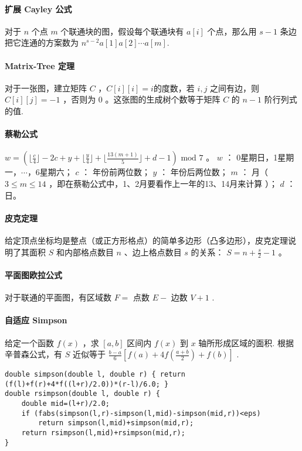\documentclass[landscape,a4paper]{article}
\begin{document}
\paragraph{扩展 Cayley 公式}
对于 $n$ 个点 $m$ 个联通块的图，假设每个联通块有 $a[i]$ 个点，那么用 $s-1$ 条边把它连通的方案数为 $n^{s-2}a[1]a[2]\cdots a[m]$.

\paragraph{Matrix-Tree 定理}
对于一张图，建立矩阵 $C$ ，$C[i][i]=i$的度数，若 $i, j$ 之间有边，则 $C[i][j] = -1$ ，否则为 $0$ 。这张图的生成树个数等于矩阵 $C$ 的 $n-1$ 阶行列式的值.

\paragraph{蔡勒公式}
$w = (\lfloor \frac{c}{4} \rfloor - 2c + y + \lfloor \frac{y}{4} \rfloor + \lfloor \frac{13(m+1)}{5} \rfloor + d - 1) \text{ mod } 7$ 。
 $w$ ： 0星期日，1星期一，$\cdots$，6星期六；
 $c$ ： 年份前两位数；
 $y$ ： 年份后两位数；
 $m$ ： 月（ $3 \leq m \leq 14$ ，即在蔡勒公式中，1、2月要看作上一年的13、14月来计算 ）；
 $d$ ： 日。

\paragraph{皮克定理}
给定顶点坐标均是整点（或正方形格点）的简单多边形（凸多边形），皮克定理说明了其面积 $S$ 和内部格点数目 $n$ 、边上格点数目 $s$ 的关系： $S = n + \frac{s}{2} - 1$ 。

\paragraph{平面图欧拉公式}
对于联通的平面图，有区域数 $F =$ 点数 $E - $ 边数 $V + 1$ .

\paragraph{自适应 Simpson}

给定一个函数 $f(x)$ ，求 $[a, b]$ 区间内 $f(x)$ 到 $x$ 轴所形成区域的面积. 根据辛普森公式，有 $S$ 近似等于 $\frac{b-a}{6}[f(a) + 4f(\frac{a+b}{2}) + f(b)]$ .

\begin{lstlisting}
double simpson(double l, double r) { return (f(l)+f(r)+4*f((l+r)/2.0))*(r-l)/6.0; }
double rsimpson(double l, double r) {
	double mid=(l+r)/2.0;
	if (fabs(simpson(l,r)-simpson(l,mid)-simpson(mid,r))<eps)
		return simpson(l,mid)+simpson(mid,r);
	return rsimpson(l,mid)+rsimpson(mid,r);
}
\end{lstlisting}
\end{document}
